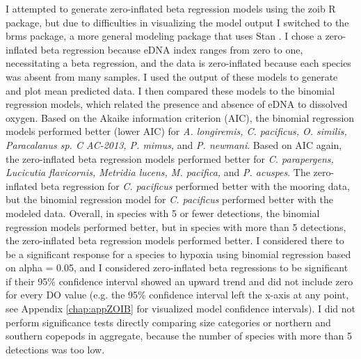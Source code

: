 \documentclass[12pt,twoside]{reedthesis}
\begin{document}
	I attempted to generate zero-inflated beta regression models using the zoib R package, but due to difficulties in visualizing the model output I switched to the brms package, a more general modeling package that uses Stan \autocite{Burkner2024}. I chose a zero-inflated beta regression because eDNA index ranges from zero to one, necessitating a beta regression, and the data is zero-inflated because each species was absent from many samples. I used the output of these models to generate and plot mean predicted data. I then compared these models to the binomial regression models, which related the presence and absence of eDNA to dissolved oxygen. Based on the Akaike information criterion (AIC), the binomial regression models performed better (lower AIC) for \textit{A. longiremis, C. pacificus, O. similis, Paracalanus sp. C AC-2013, P. mimus,} and \textit{P. newmani}. Based on AIC again, the zero-inflated beta regression models performed better for \textit{C. parapergens, Lucicutia flavicornis, Metridia lucens, M. pacifica,} and \textit{P. acuspes}. The zero-inflated beta regression for \textit{C. pacificus} performed better with the mooring data, but the binomial regression model for \textit{C. pacificus} performed better with the modeled data. Overall, in species with 5 or fewer detections, the binomial regression models performed better, but in species with more than 5 detections, the zero-inflated beta regression models performed better. I considered there to be a significant response for a species to hypoxia using binomial regression based on alpha = 0.05, and I considered zero-inflated beta regressions to be significant if their 95\% confidence interval showed an upward trend and did not include zero for every DO value (e.g. the 95\% confidence interval left the x-axis at any point, see Appendix \ref{chap:appZOIB} for visualized model confidence intervals). I did not perform significance tests directly comparing size categories or northern and southern copepods in aggregate, because the number of species with more than 5 detections was too low. 

\end{document}
